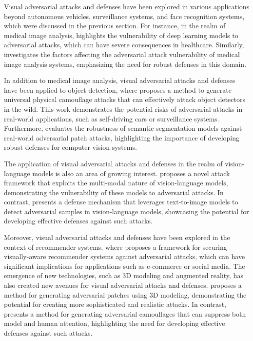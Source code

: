 \documentclass[11pt]{article}
\begin{document}
Visual adversarial attacks and defenses have been explored in various applications beyond autonomous vehicles, surveillance systems, and face recognition systems, which were discussed in the previous section. For instance, in the realm of medical image analysis, \cite{ref158} highlights the vulnerability of deep learning models to adversarial attacks, which can have severe consequences in healthcare. Similarly, \cite{ref211} investigates the factors affecting the adversarial attack vulnerability of medical image analysis systems, emphasizing the need for robust defenses in this domain.

In addition to medical image analysis, visual adversarial attacks and defenses have been applied to object detection, where \cite{ref11} proposes a method to generate universal physical camouflage attacks that can effectively attack object detectors in the wild. This work demonstrates the potential risks of adversarial attacks in real-world applications, such as self-driving cars or surveillance systems. Furthermore, \cite{ref145} evaluates the robustness of semantic segmentation models against real-world adversarial patch attacks, highlighting the importance of developing robust defenses for computer vision systems.

The application of visual adversarial attacks and defenses in the realm of vision-language models is also an area of growing interest. \cite{ref212} proposes a novel attack framework that exploits the multi-modal nature of vision-language models, demonstrating the vulnerability of these models to adversarial attacks. In contrast, \cite{ref159} presents a defense mechanism that leverages text-to-image models to detect adversarial samples in vision-language models, showcasing the potential for developing effective defenses against such attacks.

Moreover, visual adversarial attacks and defenses have been explored in the context of recommender systems, where \cite{ref213} proposes a framework for securing visually-aware recommender systems against adversarial attacks, which can have significant implications for applications such as e-commerce or social media. The emergence of new technologies, such as 3D modeling and augmented reality, has also created new avenues for visual adversarial attacks and defenses. \cite{ref156} proposes a method for generating adversarial patches using 3D modeling, demonstrating the potential for creating more sophisticated and realistic attacks. In contrast, \cite{ref214} presents a method for generating adversarial camouflages that can suppress both model and human attention, highlighting the need for developing effective defenses against such attacks.
\end{document}
